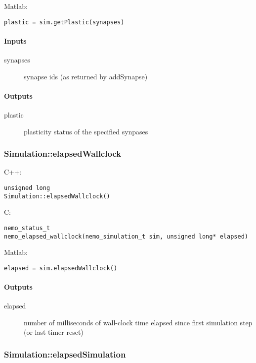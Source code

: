 \noindent Matlab:
\begin{lstlisting}[aboveskip=2pt]
plastic = sim.getPlastic(synapses)
\end{lstlisting}
\paragraph{Inputs}
\begin{description}
\item[synapses] synapse ids (as returned by addSynapse)
\end{description}
\paragraph{Outputs}
\begin{description}
\item[plastic] plasticity status of the specified synpases
\end{description}

\clearpage
\subsubsection*{Simulation::elapsedWallclock}
\label{fn: elapsedWallclock}



\noindent C++:
\begin{lstlisting}[aboveskip=2pt]
unsigned long
Simulation::elapsedWallclock()
\end{lstlisting}

\noindent C:
\begin{lstlisting}[aboveskip=2pt]
nemo_status_t
nemo_elapsed_wallclock(nemo_simulation_t sim, unsigned long* elapsed)
\end{lstlisting}

\noindent Matlab:
\begin{lstlisting}[aboveskip=2pt]
elapsed = sim.elapsedWallclock()
\end{lstlisting}
\paragraph{Outputs}
\begin{description}
\item[elapsed] number of milliseconds of wall-clock time elapsed since first simulation step (or last timer reset)
\end{description}

\clearpage
\subsubsection*{Simulation::elapsedSimulation}
\label{fn: elapsedSimulation}



